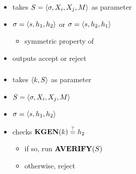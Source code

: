 \begin{frame}
	\frametitle{\averify}

	\begin{itemize}
		\item takes $S = \langle \sigma, X_i, X_j, M \rangle$ as parameter
		\item $\sigma = \langle s, h_1, h_2 \rangle$ or  $\sigma = \langle s, h_2, h_1 \rangle$
			\begin{itemize}
				\item symmetric property of \averify
			\end{itemize}
		\item outputs accept or reject
	\end{itemize}
\end{frame}

\begin{frame}
	\frametitle{\verify}

	\begin{itemize}
		\item takes $\langle k, S \rangle$ as parameter
		\item $S=\langle \sigma, X_i, X_j, M \rangle$
		\item $\sigma = \langle s, h_1, h_2 \rangle$
		\item checks $\textbf{KGEN}(k) \overset{?}{=} h_2$
			\begin{itemize}
				\item if so, run $\textbf{AVERIFY}(S)$
				\item otherwise, reject
			\end{itemize}
	\end{itemize}
\end{frame}